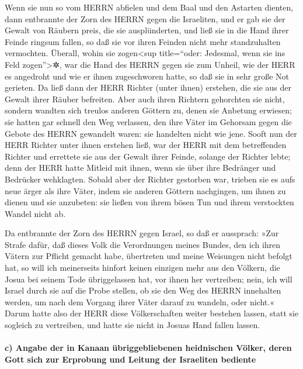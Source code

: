 Wenn sie nun so vom HERRN abfielen und dem Baal und den
Astarten dienten, dann entbrannte der Zorn des HERRN
gegen die Israeliten, und er gab sie der Gewalt von Räubern preis, die
sie ausplünderten, und ließ sie in die Hand ihrer Feinde ringsum fallen,
so daß sie vor ihren Feinden nicht mehr standzuhalten vermochten.
Überall, wohin sie zogen\textless sup title=``oder:
Jedesmal, wenn sie ins Feld zogen''\textgreater✲, war die Hand des HERRN
gegen sie zum Unheil, wie der HERR es angedroht und wie er ihnen
zugeschworen hatte, so daß sie in sehr große Not gerieten.
Da ließ dann der HERR Richter (unter ihnen) erstehen, die
sie aus der Gewalt ihrer Räuber befreiten. Aber auch
ihren Richtern gehorchten sie nicht, sondern wandten sich treulos
anderen Göttern zu, denen sie Anbetung erwiesen; sie hatten gar schnell
den Weg verlassen, den ihre Väter im Gehorsam gegen die Gebote des HERRN
gewandelt waren: sie handelten nicht wie jene. Sooft nun
der HERR Richter unter ihnen erstehen ließ, war der HERR mit dem
betreffenden Richter und errettete sie aus der Gewalt ihrer Feinde,
solange der Richter lebte; denn der HERR hatte Mitleid mit ihnen, wenn
sie über ihre Bedränger und Bedrücker wehklagten. Sobald
aber der Richter gestorben war, trieben sie es aufs neue ärger als ihre
Väter, indem sie anderen Göttern nachgingen, um ihnen zu dienen und sie
anzubeten: sie ließen von ihrem bösen Tun und ihrem verstockten Wandel
nicht ab.

Da entbrannte der Zorn des HERRN gegen Israel, so daß er
aussprach: »Zur Strafe dafür, daß dieses Volk die Verordnungen meines
Bundes, den ich ihren Vätern zur Pflicht gemacht habe, übertreten und
meine Weisungen nicht befolgt hat, so will ich
meinerseits hinfort keinen einzigen mehr aus den Völkern, die Josua bei
seinem Tode übriggelassen hat, vor ihnen her vertreiben;
nein, ich will Israel durch sie auf die Probe stellen, ob
sie den Weg des HERRN innehalten werden, um nach dem Vorgang ihrer Väter
darauf zu wandeln, oder nicht.« Darum hatte also der HERR
diese Völkerschaften weiter bestehen lassen, statt sie sogleich zu
vertreiben, und hatte sie nicht in Josuas Hand fallen lassen.

\hypertarget{c-angabe-der-in-kanaan-uxfcbriggebliebenen-heidnischen-vuxf6lker-deren-gott-sich-zur-erprobung-und-leitung-der-israeliten-bediente}{%
\paragraph{c) Angabe der in Kanaan übriggebliebenen heidnischen Völker,
deren Gott sich zur Erprobung und Leitung der Israeliten
bediente}\label{c-angabe-der-in-kanaan-uxfcbriggebliebenen-heidnischen-vuxf6lker-deren-gott-sich-zur-erprobung-und-leitung-der-israeliten-bediente}}

